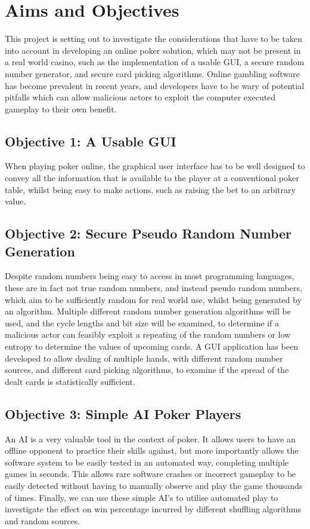 \section{Aims and Objectives}
This project is setting out to investigate the considerations that have to be
taken into account in developing an online poker solution, which may not be
present in a real world casino, such as the implementation of a usable GUI, 
a secure random number generator, and secure card picking algorithms. Online 
gambling software has become prevalent in recent years, and developers have to 
be wary of potential pitfalls which can allow malicious actors to exploit the 
computer executed gameplay to their own benefit.

\subsection{Objective 1: A Usable GUI}
When playing poker online, the graphical user interface has to be well designed
to convey all the information that is available to the player at a conventional
poker table, whilst being easy to make actions, such as raising the bet to
an arbitrary value.

\subsection{Objective 2: Secure Pseudo Random Number Generation}
Despite random numbers being easy to access in most programming languages, 
these are in fact not true random numbers, and instead pseudo random numbers, 
which aim to be sufficiently random for real world use, whilst being generated 
by an algorithm. Multiple different random number generation algorithms will
be used, and the cycle lengths and bit size will be examined, to determine if 
a malicious actor can feasibly exploit a repeating of the random numbers or 
low entropy to determine the values of upcoming cards. A GUI application has
been developed to allow dealing of multiple hands, with different random number
sources, and different card picking algorithms, to examine if the spread of
the dealt cards is statistically sufficient. 

\subsection{Objective 3: Simple AI Poker Players}
An AI is a very valuable tool in the context of poker. It allows users to have
an offline opponent to practice their skills against, but more importantly
allows the software system to be easily tested in an automated way, completing
multiple games in seconds. This allows rare software crashes or incorrect
gameplay to be easily detected without having to manually observe and play
the game thousands of times. Finally, we can use these simple AI's to utilise
automated play to investigate the effect on win percentage incurred by
different shuffling algorithms and random sources.
